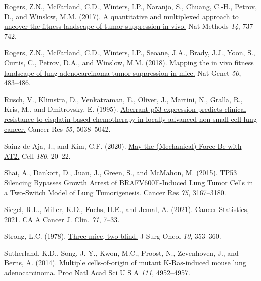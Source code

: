 \begin{CSLReferences}{0}{0}
\leavevmode{}%
Rogers, Z.N., McFarland, C.D., Winters, I.P., Naranjo, S., Chuang, C.-H., Petrov, D., and Winslow, M.M. (2017). \href{https://doi.org/10.1038/nmeth.4297}{A quantitative and multiplexed approach to uncover the fitness landscape of tumor suppression in vivo.} Nat Methods \emph{14}, 737--742.

\leavevmode{}%
Rogers, Z.N., McFarland, C.D., Winters, I.P., Seoane, J.A., Brady, J.J., Yoon, S., Curtis, C., Petrov, D.A., and Winslow, M.M. (2018). \href{https://doi.org/10.1038/s41588-018-0083-2}{Mapping the in vivo fitness landscape of lung adenocarcinoma tumor suppression in mice.} Nat Genet \emph{50}, 483--486.

\leavevmode{}%
Rusch, V., Klimstra, D., Venkatraman, E., Oliver, J., Martini, N., Gralla, R., Kris, M., and Dmitrovsky, E. (1995). \href{https://www.ncbi.nlm.nih.gov/pubmed/7585548}{Aberrant p53 expression predicts clinical resistance to cisplatin-based chemotherapy in locally advanced non-small cell lung cancer.} Cancer Res \emph{55}, 5038--5042.

\leavevmode{}%
Sainz de Aja, J., and Kim, C.F. (2020). \href{https://doi.org/10.1016/j.cell.2019.12.020}{May the (Mechanical) Force Be with AT2.} Cell \emph{180}, 20--22.

\leavevmode{}%
Shai, A., Dankort, D., Juan, J., Green, S., and McMahon, M. (2015). \href{https://doi.org/10.1158/0008-5472.can-14-3701}{TP53 Silencing Bypasses Growth Arrest of BRAFV600E-Induced Lung Tumor Cells in a Two-Switch Model of Lung Tumorigenesis.} Cancer Res \emph{75}, 3167--3180.

\leavevmode{}%
Siegel, R.L., Miller, K.D., Fuchs, H.E., and Jemal, A. (2021). \href{https://doi.org/10.3322/caac.21654}{Cancer Statistics, 2021}. CA A Cancer J. Clin. \emph{71}, 7--33.

\leavevmode{}%
Strong, L.C. (1978). \href{https://doi.org/10.1002/jso.2930100410}{Three mice, two blind.} J Surg Oncol \emph{10}, 353--360.

\leavevmode{}%
Sutherland, K.D., Song, J.-Y., Kwon, M.C., Proost, N., Zevenhoven, J., and Berns, A. (2014). \href{https://doi.org/10.1073/pnas.1319963111}{Multiple cells-of-origin of mutant K-Ras-induced mouse lung adenocarcinoma.} Proc Natl Acad Sci U S A \emph{111}, 4952--4957.


\end{CSLReferences}
